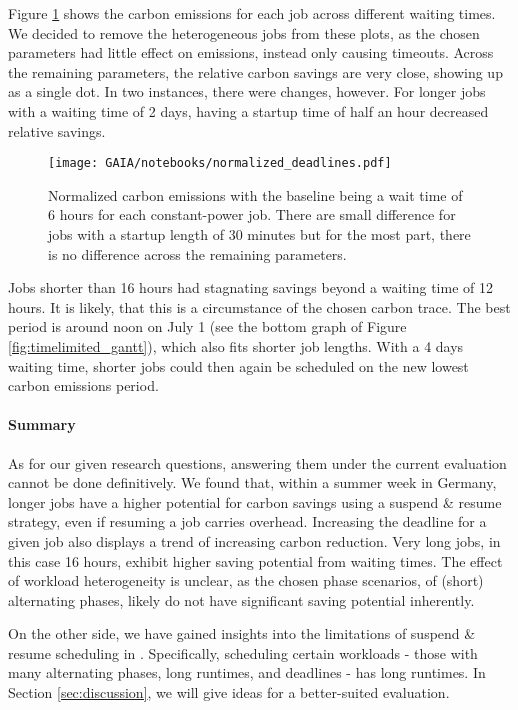 Figure \ref{fig:different_deadlines_normalized} shows the carbon emissions for each job across different waiting times.
We decided to remove the heterogeneous jobs from these plots, as the chosen parameters had little effect on emissions, instead only causing timeouts. 
Across the remaining parameters, the relative carbon savings are very close, showing up as a single dot.
In two instances, there were changes, however.
For longer jobs with a waiting time of 2 days, having a startup time of half an hour decreased relative savings. 

\begin{figure}[H]
    \texttt{[image: GAIA/notebooks/normalized\_deadlines.pdf]}
    \caption[short]{
        Normalized carbon emissions with the baseline being a wait time of 6 hours for each constant-power job. 
        There are small difference for jobs with a startup length of 30 minutes but for the most part, there is no difference across the remaining parameters.
    }

    \label{fig:different_deadlines_normalized}
\end{figure}

Jobs shorter than 16 hours had stagnating savings beyond a waiting time of 12 hours. 
It is likely, that this is a circumstance of the chosen carbon trace.
The best period is around noon on July 1 (see the bottom graph of Figure \ref{fig:timelimited_gantt}), which also fits shorter job lengths. 
With a 4 days waiting time, shorter jobs could then again be scheduled on the new lowest carbon emissions period.

\paragraph{Summary}

As for our given research questions, answering them under the current evaluation cannot be done definitively. We found that, within a summer week in Germany, longer jobs have a higher potential for carbon savings using a suspend \& resume strategy, even if resuming a job carries overhead. Increasing the deadline for a given job also displays a trend of increasing carbon reduction. 
Very long jobs, in this case 16 hours, exhibit higher saving potential from waiting times.
The effect of workload heterogeneity is unclear, as the chosen phase scenarios, of (short) alternating phases, likely do not have significant saving potential inherently.

On the other side, we have gained insights into the limitations of suspend \& resume scheduling in \programname{}. Specifically, scheduling certain workloads - those with many alternating phases, long runtimes, and deadlines - has long runtimes.
In Section \ref{sec:discussion}, we will give ideas for a better-suited evaluation.
